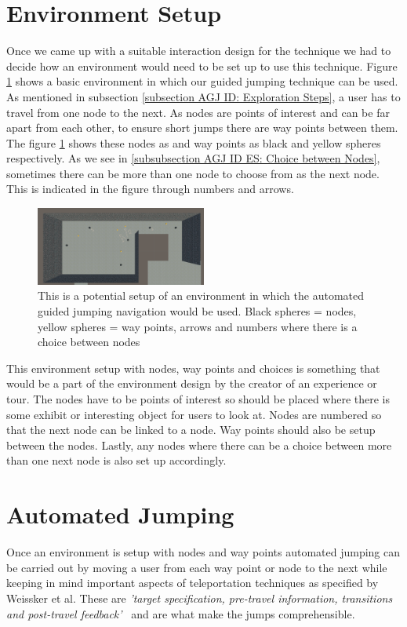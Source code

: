 \section{Environment Setup}
\label{section AGJ: Environment Setup}

Once we came up with a suitable interaction design for the technique we had to decide how an environment would need to be set up to use this technique. Figure \ref{fig:interaction-design-layout} shows a basic environment in which our guided jumping technique can be used. As mentioned in subsection \ref{subsection AGJ ID: Exploration Steps}, a user has to travel from one node to the next. As nodes are points of interest and can be far apart from each other, to ensure short jumps there are way points between them. The figure \ref{fig:interaction-design-layout} shows these nodes as and way points as black and yellow spheres respectively. As we see in \ref{subsubsection AGJ ID ES: Choice between Nodes}, sometimes there can be more than one node to choose from as the next node. This is indicated in the figure through numbers and arrows.     
\begin{figure}[]
	\centering
	\includegraphics[width=0.5\textwidth]{images/interaction-design-layout.pdf} 
	\caption{This is a potential setup of an environment in which the automated guided jumping navigation would be used. Black spheres = nodes, yellow spheres = way points, arrows and numbers where there is a choice between nodes}
	\label{fig:interaction-design-layout}
\end{figure}

This environment setup with nodes, way points and choices is something that would be a part of the environment design by the creator of an experience or tour. The nodes have to be points of interest so should be placed where there is some exhibit or interesting object for users to look at. Nodes are numbered so that the next node can be linked to a node. Way points should also be setup between the nodes. Lastly, any nodes where there can be a choice between more than one next node is also set up accordingly.
 
\section{Automated Jumping}
\label{section AGJ: Automated Jumping}
Once an environment is setup with nodes and way points automated jumping can be carried out by moving a user from each way point or node to the next while keeping in mind important aspects of teleportation techniques as specified by Weissker et al. These are \textit{'target specification, pre-travel information, transitions and post-travel feedback'}~\cite{Weissker2018} and are what make the jumps comprehensible.

